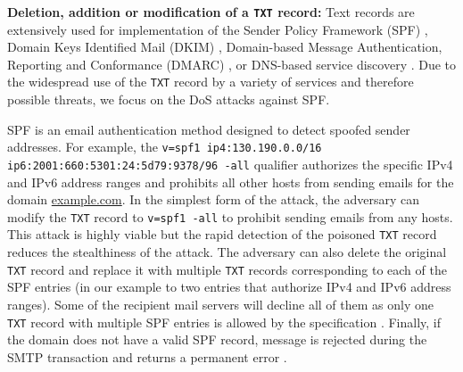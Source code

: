 \textbf{Deletion, addition or modification of a \texttt{TXT} record:} Text records are extensively used for implementation of the Sender Policy Framework (SPF) \cite{spf}, Domain Keys Identified Mail (DKIM) \cite{dkim}, Domain-based Message Authentication, Reporting and Conformance (DMARC) \cite{dmarc}, or DNS-based service discovery \cite{rfc6763}.
Due to the widespread use of the \texttt{TXT} record by a variety of services and therefore possible threats, we focus on the DoS attacks against SPF.

SPF is an email authentication method designed to detect spoofed sender addresses. %
For example, the %
\texttt{v=spf1 ip4:130.190.0.0/16} \texttt{ip6:2001:660:5301:24:5d79:9378/96 -all} qualifier %
authorizes the specific IPv4 and IPv6 address ranges 
and prohibits all other hosts from sending emails for the domain \url{example.com}.
%
In the simplest form of the attack, the adversary can modify the \texttt{TXT} record to \texttt{v=spf1 -all} to prohibit sending emails from any hosts. %
This attack is highly viable but the rapid detection of the poisoned \texttt{TXT} record reduces the stealthiness of the attack. %
The adversary can also delete the original \texttt{TXT} record and replace it with multiple \texttt{TXT} records corresponding to each of the SPF entries (in our example to two entries that authorize IPv4 and IPv6 address ranges). %
Some of the recipient mail servers will decline all of them as only one \texttt{TXT} record with multiple SPF entries is allowed by the specification \cite{spf}. 
%
%
%
Finally, if the domain does not have a valid SPF record, %
message is rejected during the SMTP transaction and returns a permanent error \cite{spf}.
